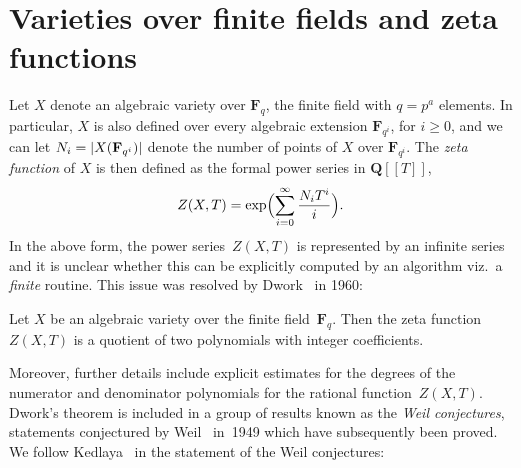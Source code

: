 

\section{Varieties over finite fields and zeta functions}

Let $X$ denote an algebraic variety over $\mathbf{F}_q$, the finite 
field with $q = p^a$ elements.  In particular, $X$ is also defined 
over every algebraic extension $\mathbf{F}_{q^i}$, for $i \geq 0$, 
and we can let $N_i = \lvert X(\mathbf{F}_{q^i}) \rvert$ denote the number 
of points of $X$ over $\mathbf{F}_{q^i}$.  The \emph{zeta function} 
of $X$ is then defined as the formal power series in $\mathbf{Q}[[T]]$,
\begin{equation*}
Z(X, T) = \exp \Bigl( \sum_{i=0}^{\infty} \frac{N_i T^i}{i} \Bigr).
\end{equation*}
In the above form, the power series~$Z(X, T)$ is represented by an 
infinite series and it is unclear whether this can be explicitly 
computed by an algorithm viz.\ a \emph{finite} routine.  This issue 
was resolved by Dwork~\citep{Dwork1960} in 1960:

\begin{thm}
Let $X$ be an algebraic variety over the finite field~$\mathbf{F}_q$.  
Then the zeta function $Z(X, T)$ is a quotient of two polynomials with 
integer coefficients.
\end{thm}

Moreover, further details include explicit estimates for the 
degrees of the numerator and denominator polynomials for the 
rational function~$Z(X, T)$.  Dwork's theorem is included 
in a group of results known as the \emph{Weil conjectures}, statements 
conjectured by Weil~\citep{Weil1949} in~1949 which have subsequently 
been proved.  We follow Kedlaya~\citep[Theorem~1.2.1]{Kedlaya2011} in 
the statement of the Weil conjectures:


